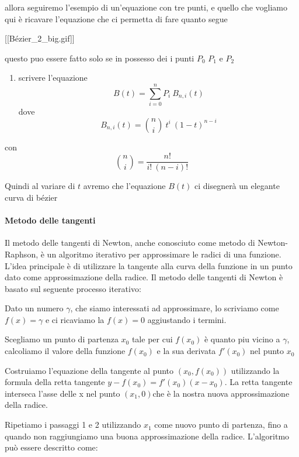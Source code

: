 \documentclass[
]{article}
\providecommand{\tightlist}{%
  \setlength{\itemsep}{0pt}\setlength{\parskip}{0pt}}
\begin{document}
allora seguiremo l'esempio di un'equazione con tre punti, e quello che
vogliamo qui è ricavare l'equazione che ci permetta di fare quanto segue

{[}{[}Bézier\_2\_big.gif{]}{]}

questo puo essere fatto solo se in possesso dei i punti \(P_{0}\)
\(P_{1}\) e \(P_{2}\)

\begin{enumerate}
\def\labelenumi{\arabic{enumi}.}
\tightlist
\item
  scrivere l'equazione \[B(t) = \sum_{i=0}^{n}P_{i}\ B_{n,i}(t)\] dove
  \[
  B_{n,i}(t) = \binom{n}{i} \ t^{i} \ (1-t)^{n-i} 
  \]
\end{enumerate}

con \[
\binom{n}{i} = \frac{n!}{i!\ (n-i)! }
\]

Quindi al variare di \(t\) avremo che l'equazione \(B(t)\) ci disegnerà
un elegante curva di bézier

\paragraph{Metodo delle tangenti}\label{metodo-delle-tangenti}

Il metodo delle tangenti di Newton, anche conosciuto come metodo di
Newton-Raphson, è un algoritmo iterativo per approssimare le radici di
una funzione. L'idea principale è di utilizzare la tangente alla curva
della funzione in un punto dato come approssimazione della radice. Il
metodo delle tangenti di Newton è basato sul seguente processo
iterativo:

Dato un numero \(\gamma\), che siamo interessati ad approssimare, lo
scriviamo come \(f(x) = \gamma\) e ci ricaviamo la \(f(x) = 0\)
aggiustando i termini.

Scegliamo un punto di partenza \(x_0\) tale per cui \(f(x_{0})\) è
quanto piu vicino a \(\gamma\), calcoliamo il valore della funzione
\(f(x_0)\) e la sua derivata \(f'(x_0)\) nel punto \(x_0\)

Costruiamo l'equazione della tangente al punto \((x_0, f(x_0))\)
utilizzando la formula della retta tangente
\(y - f(x_0) = f'(x_0)(x - x_0)\). La retta tangente interseca l'asse
delle x nel punto \((x_1, 0)\)che è la nostra nuova approssimazione
della radice.

Ripetiamo i passaggi 1 e 2 utilizzando \(x_1\) come nuovo punto di
partenza, fino a quando non raggiungiamo una buona approssimazione della
radice. L'algoritmo può essere descritto come:
\end{document}
